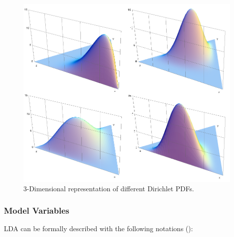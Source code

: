 \documentclass[a4paper, 12pt, twoside]{article}
\numberwithin{equation}{section} %
\begin{document}
\begin{figure}[h]
\includegraphics[scale=0.25]{Dirichlet_distributions.png}
\centering
\caption{3-Dimensional representation of different Dirichlet PDFs.}
\label{dirichlet_distributions}
\end{figure}

\subsubsection{Model Variables}

LDA can be formally described with the following notations (\cite{blei2012}): 
\end{document}
